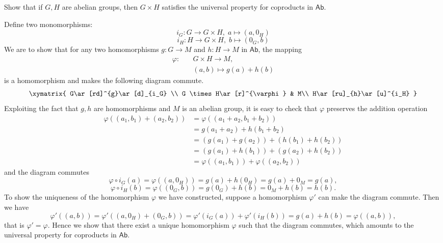\documentclass[12pt,letterpaper,boxed]{hmcpset}
\begin{document}
\hypertarget{Exercise 3.3}{}
\begin{problem}[3.3]	
	Show that if $G, H$ are abelian groups, then $G \times H$ satisfies the universal property for coproducts in $\mathsf{Ab}$.
\end{problem}
\begin{solution}
	Define two monomorphisms:
	\[
	i_G:G\longrightarrow G\times H,\;a\longmapsto (a,0_H)
	\]
	\[
	i_H:H\longrightarrow G\times H,\;b\longmapsto (0_G,b)
	\]
	We are to show that for any two homomorphisms $g:G\rightarrow M$ and $h:H\rightarrow M$ in $\mathsf{Ab}$, the mapping
	\[
	\begin{aligned}
	\varphi:\quad & G\times H\longrightarrow M,\\
	         & (a,b)\longmapsto g(a)+h(b)
	\end{aligned}
    \]
    is a homomorphism and makes the following diagram commute. 
	\[\xymatrix{
		G\ar[rd]^{g}\ar[d]_{i_G}  \\
		G \times H\ar[r]^{\varphi} &  M\\
		H\ar[ru]_{h}\ar[u]^{i_H}  
	}\]
	Exploiting the fact that $g,h$ are homomorphisms and $M$ is an abelian group, it is easy to check that $\varphi$ preserves the addition operation
	\[
	\begin{aligned}
	\varphi((a_1,b_1)+(a_2,b_2))&=\varphi((a_1+a_2,b_1+b_2))\\
	&=g(a_1+a_2)+h(b_1+b_2)\\
	&=(g(a_1)+g(a_2))+(h(b_1)+h(b_2))\\
	&=(g(a_1)+h(b_1))+(g(a_2)+h(b_2))\\
	&=\varphi((a_1,b_1))+\varphi((a_2,b_2))
	\end{aligned}
	\]
	and the diagram commutes
	\[
	\varphi\circ i_G(a)=\varphi((a,0_H))=g(a)+h(0_H)=g(a)+0_M=g(a),
	\]
	\[
	\varphi\circ i_H(b)=\varphi((0_G,b))=g(0_G)+h(b)=0_M+h(b)=h(b).
	\]
	To show the uniqueness of the homomorphism $\varphi$ we have constructed, suppose a homomorphism $\varphi'$ can make the diagram commute. Then we have
	\[
	\varphi'((a,b))=\varphi'((a,0_H)+(0_G,b))=\varphi'(i_G(a))+\varphi'(i_H(b))=g(a)+h(b)=\varphi((a,b)),
	\]
	that is $\varphi'=\varphi$. Hence we show that there exist a unique homomorphism $\varphi$ such that the diagram commutes, which amounts to the universal property for coproducts in $\mathsf{Ab}$.
	
\end{solution}
\end{document}
